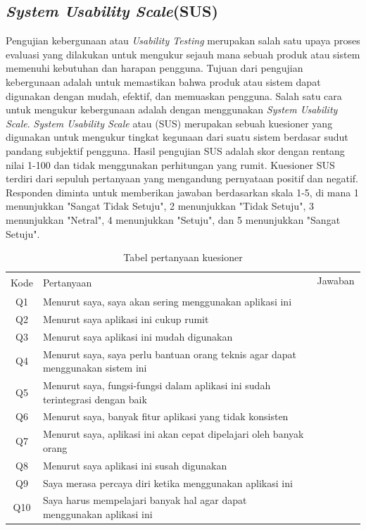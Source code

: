 \subsection{\textit{System Usability Scale}(SUS)}
Pengujian kebergunaan atau \textit{Usability Testing} merupakan salah satu upaya proses evaluasi yang dilakukan untuk mengukur sejauh mana sebuah produk atau sistem memenuhi kebutuhan dan harapan pengguna\cite{dumas1999practical}. 
Tujuan dari pengujian kebergunaan adalah untuk memastikan bahwa produk atau sistem dapat digunakan dengan mudah, efektif, dan memuaskan pengguna.
Salah satu cara untuk mengukur kebergunaan adalah dengan menggunakan \textit{System Usability Scale}. \textit{System Usability Scale} atau (SUS) merupakan sebuah kuesioner yang digunakan untuk mengukur tingkat kegunaan dari suatu sistem berdasar sudut pandang subjektif pengguna.
Hasil pengujian SUS adalah skor dengan rentang nilai 1-100 dan tidak menggunakan perhitungan yang rumit. 
Kuesioner SUS terdiri dari sepuluh pertanyaan yang mengandung pernyataan positif dan negatif\cite{dumas1999practical}. 
Responden diminta untuk memberikan jawaban berdasarkan skala 1-5, di mana 1 menunjukkan "Sangat Tidak Setuju", 2 menunjukkan "Tidak Setuju", 3 menunjukkan "Netral", 4 menunjukkan "Setuju", dan 5 menunjukkan "Sangat Setuju".
\begin{table}[H]
	\caption{Tabel pertanyaan kuesioner}
	\label{Tabel pertanyaan kuesioner sus}
	\centering
	\begin{tabular}{|c|m{7cm}|m{0.5cm}|m{0.5cm}|m{0.5cm}|m{0.5cm}|m{0.5cm}|}
		\hline
		\multirow{2}{1cm}{Kode} & \multirow{2}{7cm}{\centering Pertanyaan}& \multicolumn{5}{c|}{\centering Jawaban} \\
		\cline{3-7}
		 & &\centering 1 & \centering  2 & \centering 3 & \centering 4 & \multicolumn{1}{m{0.5cm}|}{\centering 5} \\
		 \hline
		 Q1&Menurut saya, saya akan sering menggunakan aplikasi ini& &  &  &  &  \\
		 \hline
		 Q2&Menurut saya aplikasi ini cukup rumit& & & &  &  \\
		 \hline
		 Q3&Menurut saya aplikasi ini mudah digunakan& & & & & \\
		 \hline
		 Q4&Menurut saya, saya perlu bantuan orang teknis agar dapat menggunakan sistem ini& & & & & \\
		 \hline
		 Q5&Menurut saya, fungsi-fungsi dalam aplikasi ini sudah terintegrasi dengan baik& & & & & \\
		 \hline
		 Q6&Menurut saya, banyak fitur aplikasi yang tidak konsisten& & & & & \\
		 \hline
		 Q7&Menurut saya, aplikasi ini akan cepat dipelajari oleh banyak orang& & & & & \\
		 \hline
		 Q8&Menurut saya aplikasi ini susah digunakan& & & & & \\
		 \hline
		 Q9&Saya merasa percaya diri ketika menggunakan aplikasi ini& & & & & \\
		 \hline
		 Q10&Saya harus mempelajari banyak hal agar dapat menggunakan aplikasi ini& & & & & \\
		 \hline
	\end{tabular}
\end{table}
